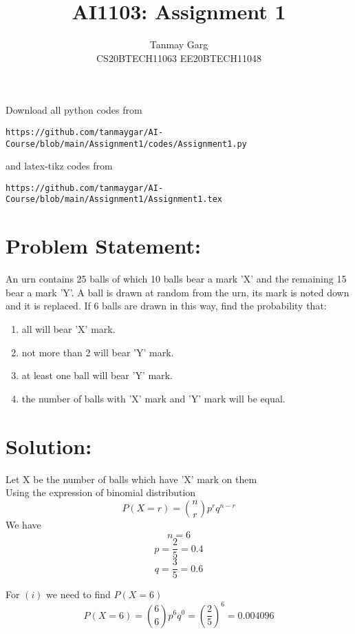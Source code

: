 \documentclass[journal,12pt,twocolumn]{IEEEtran}
\begin{document}
     \def\rightbox#1{\makebox[0in][r]{#1}}
     \def\centbox#1{\makebox[0in]{#1}}
     \def\topbox#1{\raisebox{-\baselineskip}[0in][0in]{#1}}
     \def\midbox#1{\raisebox{-0.5\baselineskip}[0in][0in]{#1}}
\vspace{3cm}
\title{AI1103: Assignment 1}
\author{Tanmay Garg \\CS20BTECH11063 EE20BTECH11048}
\maketitle
\newpage
\bigskip
\renewcommand{\thefigure}{\theenumi}
\renewcommand{\thetable}{\theenumi}
Download all python codes from 
\begin{lstlisting}
https://github.com/tanmaygar/AI-Course/blob/main/Assignment1/codes/Assignment1.py
\end{lstlisting}
%
and latex-tikz codes from 
%
\begin{lstlisting}
https://github.com/tanmaygar/AI-Course/blob/main/Assignment1/Assignment1.tex
\end{lstlisting}

\section*{Problem Statement: }
An urn contains 25 balls of which 10 balls
bear a mark ’X’ and the remaining 15 bear a
mark ’Y’.
A ball is drawn at random from the
urn, its mark is noted down and it is replaced.
If 6 balls are drawn in this way, find the
probability that:
\begin{enumerate}
    \item all will bear 'X' mark.
    \item not more than 2 will bear 'Y' mark.
    \item at least one ball will bear 'Y' mark.
    \item the number of balls with 'X' mark and 'Y' mark will be equal.
\end{enumerate}

\section*{Solution:}
Let X be the number of balls which have 'X' mark on them\\
Using the expression of binomial distribution
\[P(X = r) = {n \choose r} p^r q^{n-r}\]
We have
\[n = 6\]
\[p = \frac{2}{5} = 0.4\] 
\[q = \frac{3}{5} = 0.6\] 

For \((i)\) we need to find \(P(X = 6)\)
\[P(X = 6) = {6 \choose 6} p^6 q^0 = \left(\frac{2}{5} \right)^6 = 0.004096\]
\end{document}
